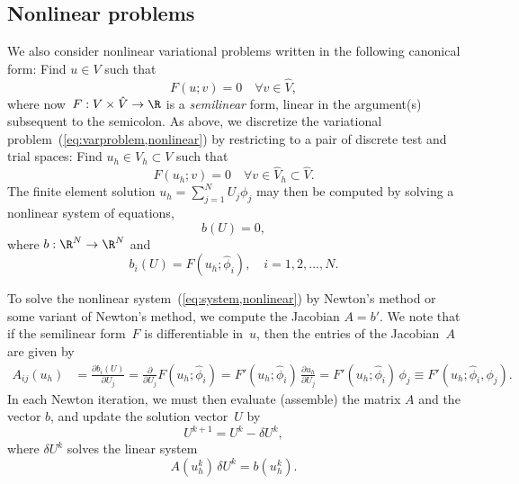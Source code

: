 \subsection{Nonlinear problems}
\label{sec:abstract,nonlinear}

We also consider nonlinear variational problems written in the
following canonical form: Find $u \in V$ such that
\begin{equation} \label{eq:varproblem,nonlinear}
  F(u; v) = 0 \quad \forall v \in \hat{V},
\end{equation}
where now~$F : V \times \hat{V} \rightarrow \R$ is a \emph{semilinear}
form, linear in the argument(s) subsequent to the semicolon. As above,
we discretize the variational problem~(\ref{eq:varproblem,nonlinear})
by restricting to a pair of discrete test and trial spaces: Find $u_h
\in V_h \subset V$ such that
\begin{displaymath}
  F(u_h; v) = 0 \quad \forall v \in \hat{V}_h \subset \hat{V}.
\end{displaymath}
The finite element solution $u_h = \sum_{j=1}^N U_j \phi_j$ may then
be computed by solving a nonlinear system of equations,
\begin{equation} \label{eq:system,nonlinear}
  b(U) = 0,
\end{equation}
where $b : \R^N \rightarrow \R^N$ and
\begin{equation}
  b_i(U) = F(u_h; \hat{\phi}_i), \quad i=1,2,\ldots,N.
\end{equation}

To solve the nonlinear system~(\ref{eq:system,nonlinear}) by Newton's
method or some variant of Newton's method, we compute the Jacobian $A
= b'$. We note that if the semilinear form~$F$ is differentiable
in~$u$, then the entries of the Jacobian~$A$ are given by
\begin{equation} \label{eq:jacobian}
  \begin{split}
    A_{ij}(u_h)
    &= \frac{\partial b_i(U)}{\partial U_j}
    = \frac{\partial}{\partial U_j} F(u_h; \hat{\phi}_i)
    = F'(u_h; \hat{\phi}_i) \, \frac{\partial u_h}{\partial U_j}
    = F'(u_h; \hat{\phi}_i) \, \phi_j
    \equiv F'(u_h; \hat{\phi}_i,\phi_j).
  \end{split}
\end{equation}
In each Newton iteration, we must then evaluate (assemble) the matrix
$A$ and the vector $b$, and update the solution vector~$U$ by
\begin{displaymath}
  U^{k+1} = U^k - \delta U^k,
\end{displaymath}
where $\delta U^k$ solves the linear system
\begin{equation} \label{eq:system,linearization}
  A(u_h^k) \, \delta U^k = b(u_h^k).
\end{equation}

